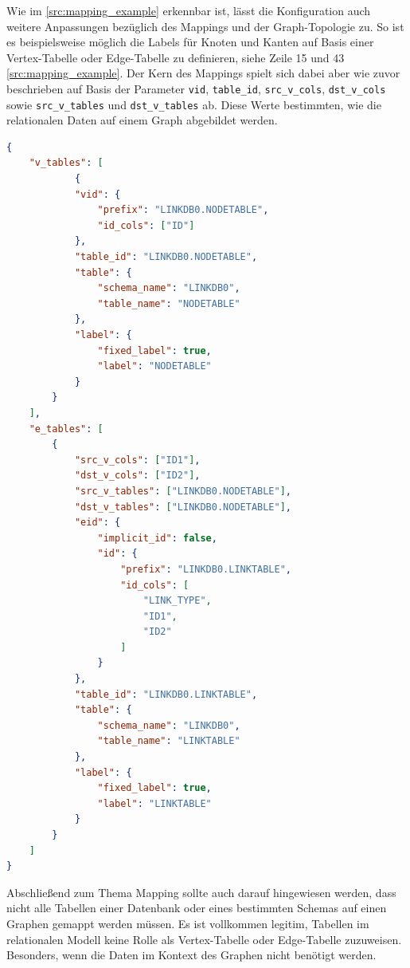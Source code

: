 Wie im \autoref{src:mapping_example} erkennbar ist, lässt die Konfiguration auch weitere Anpassungen bezüglich des Mappings und der Graph-Topologie zu. So ist es beispielsweise möglich die Labels für Knoten und Kanten auf Basis einer Vertex-Tabelle oder Edge-Tabelle zu definieren, siehe Zeile 15 und 43 \autoref{src:mapping_example}. Der Kern des Mappings spielt sich dabei aber wie zuvor beschrieben auf Basis der Parameter \texttt{vid}, \texttt{table\_id}, \texttt{src\_v\_cols}, \texttt{dst\_v\_cols} sowie \texttt{src\_v\_tables} und \texttt{dst\_v\_tables} ab. Diese Werte bestimmten, wie die relationalen Daten auf einem Graph abgebildet werden.

\begin{lstlisting}[caption={Beispiel Auschnitt Mapping Konfiguration},language=json,label=src:mapping_example]
{
    "v_tables": [
            {
            "vid": {
                "prefix": "LINKDB0.NODETABLE",
                "id_cols": ["ID"]
            },
            "table_id": "LINKDB0.NODETABLE",
            "table": {
                "schema_name": "LINKDB0",
                "table_name": "NODETABLE"
            },
            "label": {
                "fixed_label": true,
                "label": "NODETABLE"
            }
        }
    ],
    "e_tables": [
        {
            "src_v_cols": ["ID1"],
            "dst_v_cols": ["ID2"],
            "src_v_tables": ["LINKDB0.NODETABLE"],
            "dst_v_tables": ["LINKDB0.NODETABLE"],
            "eid": {
                "implicit_id": false,
                "id": {
                    "prefix": "LINKDB0.LINKTABLE",
                    "id_cols": [
                        "LINK_TYPE",
                        "ID1",
                        "ID2"
                    ]
                }
            },
            "table_id": "LINKDB0.LINKTABLE",
            "table": {
                "schema_name": "LINKDB0",
                "table_name": "LINKTABLE"
            },
            "label": {
                "fixed_label": true,
                "label": "LINKTABLE"
            }
        }
    ]
}
\end{lstlisting}

Abschließend zum Thema Mapping sollte auch darauf hingewiesen werden, dass nicht alle Tabellen einer Datenbank oder eines bestimmten Schemas auf einen Graphen gemappt werden müssen. Es ist vollkommen legitim, Tabellen im relationalen Modell keine Rolle als Vertex-Tabelle oder Edge-Tabelle zuzuweisen. Besonders, wenn die Daten im Kontext des Graphen nicht benötigt werden. 

